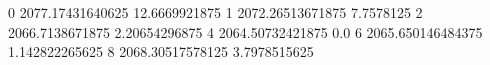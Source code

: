 0 2077.17431640625 12.6669921875
1 2072.26513671875 7.7578125
2 2066.7138671875 2.20654296875
4 2064.50732421875 0.0
6 2065.650146484375 1.142822265625
8 2068.30517578125 3.7978515625
